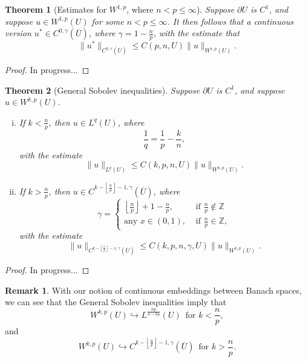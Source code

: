 \documentclass[11pt]{article}
\newtheorem{theorem}{Theorem}
\theoremstyle{definition}
\newtheorem*{remark}{Remark}
\begin{document}
\begin{theorem}[Estimates for $W^{1,p}$, where $n < p \leq \infty$]
Suppose $\partial U$ is $C^1$,
	and suppose $u \in W^{1,p}(U)$ for some $n < p \leq \infty$. It then follows that a continuous version $u^* \in C^{0,\gamma}(\overline{U})$,
where $\gamma = 1 - \frac{n}{p}$, with the estimate that
	\[\|u^*\|_{C^{0,\gamma}(\overline{U})} \leq C(p,n,U)\|u\|_{W^{1,p}(U)}.\]
\end{theorem}
\begin{proof}
In progress...
\end{proof}

\begin{theorem}[General Sobolev inequalities]
	Suppose $\partial U$ is $C^1$, and suppose $u \in W^{k,p}(U)$.
	\begin{enumerate}[(i)]
		\item If $k < \frac{n}{p}$, then $u \in L^q(U)$, where
			\begin{equation*}
				\frac{1}{q} = \frac{1}{p} - \frac{k}{n},
			\end{equation*}
			with the estimate
			\begin{equation*}
				\|u\|_{L^q(U)} \leq C(k,p,n,U)\|u\|_{W^{k,p}(U)}.
			\end{equation*}
		\item If $k > \frac{n}{p}$, then $u \in C^{k-\left\lfloor\frac{n}{p}\right\rfloor-1, \gamma}(\overline{U})$, where
			\begin{equation*}
				\gamma =
				\begin{cases}
					\left\lfloor \frac{n}{p} \right\rfloor + 1 - \frac{n}{p}, &\text{ if } \frac{n}{p} \not\in \mathbb{Z} \\
					\text{any } x\in (0,1), &\text{ if } \frac{n}{p} \in \mathbb{Z},
				\end{cases}
			\end{equation*}
			with the estimate
			\begin{equation*}
				\|u\|_{C^{k-\left\lfloor\frac{n}{p}\right\rfloor-1, \gamma}(\overline{U})} \leq C(k,p,n,\gamma,U)\|u\|_{W^{k,p}(U)}.
			\end{equation*}
	\end{enumerate}
\end{theorem}
\begin{proof}
In progress...
\end{proof}

\begin{remark}
	With our notion of continuous embeddings between Banach spaces, we can see that the General Sobolev inequalities
	imply that
	\begin{equation*}
		W^{k,p}(U) \hookrightarrow L^{\frac{np}{n - kp}}(U) \,\text{ for } k < \frac{n}{p},
	\end{equation*}
	and
	\begin{equation*}
		W^{k,p}(U) \hookrightarrow C^{k-\left\lfloor\frac{n}{p}\right\rfloor-1, \gamma}(\overline{U}) \,\text{ for } k > \frac{n}{p}.
	\end{equation*}
\end{remark}
\end{document}
